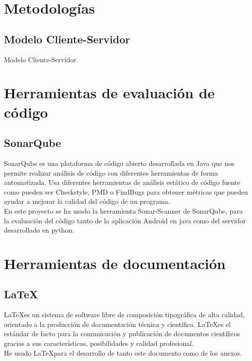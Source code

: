 \section{Metodologías}

\subsection{Modelo Cliente-Servidor}

Modelo Cliente-Servidor.



\section{Herramientas de evaluación de código}

\subsection{SonarQube}

SonarQube es una plataforma de código abierto desarrollada en Java que nos permite realizar análisis de código con diferentes herramientas de forma automatizada. Usa diferentes herramientas de análisis estático de código fuente como pueden ser Checkstyle, PMD o FindBugs para obtener métricas que pueden ayudar a mejorar la calidad del código de un programa.\\
En este proyecto se ha usado la herramienta Sonar-Scanner de SonarQube, para la evaluación del código tanto de la aplicación Android en java como del servidor desarrollado en python.



\section{Herramientas de documentación}

\subsection{\LaTeX}

\LaTeX es un sistema de software libre de composición tipográfica de alta calidad, orientado a la producción de documentación técnica y científica. \LaTeX es el estándar de facto para la comunicación y publicación de documentos científicos gracias a sus características, posibilidades y calidad profesional.\\
He usado \LaTeX para el desarrollo de tanto este documento como de los anexos.



